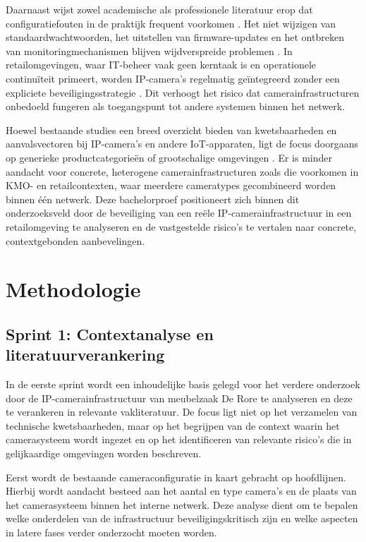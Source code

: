 Daarnaast wijst zowel academische als professionele literatuur erop dat configuratiefouten in de praktijk frequent voorkomen \parencite{ENISA2024ThreatLandscape, AlfredCamera2022}. Het niet wijzigen van standaardwachtwoorden, het uitstellen van firmware-updates en het ontbreken van monitoringmechanismen blijven wijdverspreide problemen \parencite{AlfredCamera2022}. In retailomgevingen, waar IT-beheer vaak geen kerntaak is en operationele continuïteit primeert, worden IP-camera’s regelmatig geïntegreerd zonder een expliciete beveiligingsstrategie \parencite{ENISA2024ThreatLandscape}. Dit verhoogt het risico dat camerainfrastructuren onbedoeld fungeren als toegangspunt tot andere systemen binnen het netwerk.

Hoewel bestaande studies een breed overzicht bieden van kwetsbaarheden en aanvalsvectoren bij IP-camera’s en andere IoT-apparaten, ligt de focus doorgaans op generieke productcategorieën of grootschalige omgevingen \parencite{Butun2019arXivIoTSecurity}. Er is minder aandacht voor concrete, heterogene camerainfrastructuren zoals die voorkomen in KMO- en retailcontexten, waar meerdere cameratypes gecombineerd worden binnen één netwerk. Deze bachelorproef positioneert zich binnen dit onderzoeksveld door de beveiliging van een reële IP-camerainfrastructuur in een retailomgeving te analyseren en de vastgestelde risico’s te vertalen naar concrete, contextgebonden aanbevelingen.

\section{Methodologie}

\subsection*{Sprint 1: Contextanalyse en literatuurverankering}

In de eerste sprint wordt een inhoudelijke basis gelegd voor het verdere onderzoek door de IP-camerainfrastructuur van meubelzaak De Rore te analyseren en deze te verankeren in relevante vakliteratuur. De focus ligt niet op het verzamelen van technische kwetsbaarheden, maar op het begrijpen van de context waarin het camerasysteem wordt ingezet en op het identificeren van relevante risico’s die in gelijkaardige omgevingen worden beschreven.

Eerst wordt de bestaande cameraconfiguratie in kaart gebracht op hoofdlijnen. Hierbij wordt aandacht besteed aan het aantal en type camera’s en de plaats van het camerasysteem binnen het interne netwerk. Deze analyse dient om te bepalen welke onderdelen van de infrastructuur beveiligingskritisch zijn en welke aspecten in latere fases verder onderzocht moeten worden.

